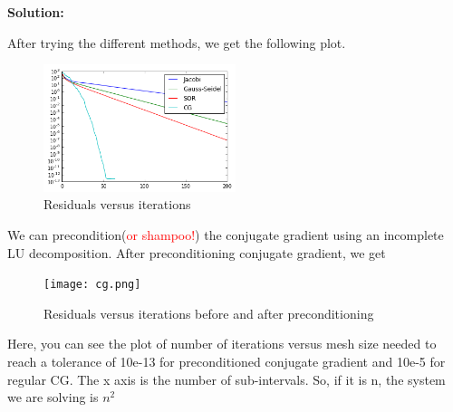\documentclass[letterpaper,12pt]{article}
\begin{document}
\begin{enumerate}
{\bf Solution:}

After trying the different methods, we get the following plot.
\begin{figure}[H]

\centering
\includegraphics[width=0.5\textwidth]{sor.png}
\caption{Residuals versus iterations}
\end{figure}

We can precondition(\textcolor{red}{or shampoo!}) the conjugate gradient using an incomplete LU decomposition. After preconditioning conjugate gradient, we get
\begin{figure}[H]
\centering
\texttt{[image: cg.png]}
\caption{Residuals versus iterations before and after preconditioning}
\end{figure}

Here, you can see the plot of number of iterations versus mesh size needed to reach a tolerance of 10e-13 for preconditioned conjugate gradient and 10e-5 for regular CG.
The x axis is the number of sub-intervals. So, if it is n, the system we are solving is $n^2$


\end{enumerate}
\end{document}
